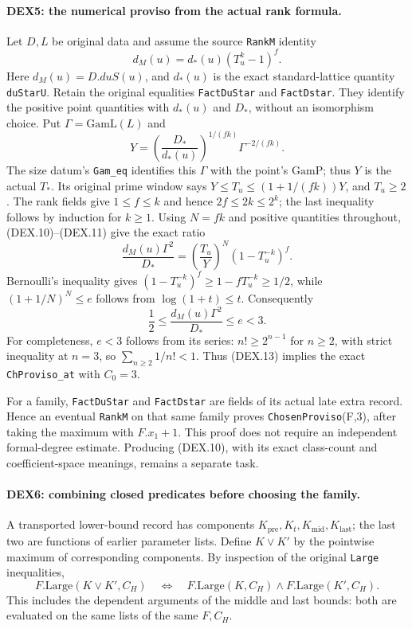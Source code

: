 \documentclass[11pt,a4paper]{article}
\numberwithin{equation}{section}
\theoremstyle{remark}\newtheorem{remark}[theorem]{Remark}
\begin{document}
\paragraph{DEX5: the numerical proviso from the actual rank formula.}
\label{claim:DEX5}
Let $D,L$ be original data and assume the source \texttt{RankM} identity
\[
 d_M(u)=d_*(u)(T_u^k-1)^f.                              \tag{DEX.10}
\]
Here $d_M(u)=D.duS(u)$, and $d_*(u)$ is the exact standard-lattice
quantity \texttt{duStarU}. Retain the original equalities
\texttt{FactDuStar} and \texttt{FactDstar}. They identify the positive
point quantities with $d_*(u)$ and $D_*$, without an isomorphism choice.
Put $\Gamma=\mathrm{GamL}(L)$ and
\[
 Y=\left(\frac{D_*}{d_*(u)}\right)^{1/(fk)}
                  \Gamma^{-2/(fk)} .                    \tag{DEX.11}
\]
The size datum's \texttt{Gam\_eq} identifies this $\Gamma$ with the
point's $\mathrm{GamP}$; thus $Y$ is the actual $T_*$.
Its original prime window says
$Y\le T_u\le(1+1/(fk))Y$, and $T_u\ge2$.
The rank fields give $1\le f\le k$ and hence
$2f\le2k\le2^k$; the last inequality follows by induction for $k\ge1$.
Using $N=fk$ and positive quantities throughout, (DEX.10)--(DEX.11)
give the exact ratio
\[
 \frac{d_M(u)\Gamma^2}{D_*}
       =\left(\frac{T_u}{Y}\right)^N(1-T_u^{-k})^f.       \tag{DEX.12}
\]
Bernoulli's inequality gives
$(1-T_u^{-k})^f\ge1-fT_u^{-k}\ge1/2$, while
$(1+1/N)^N\le e$ follows from $\log(1+t)\le t$.
Consequently
\[
                  \frac12\le\frac{d_M(u)\Gamma^2}{D_*}
                                      \le e<3.           \tag{DEX.13}
\]
For completeness, $e<3$ follows from its series:
$n!\ge2^{n-1}$ for $n\ge2$, with strict inequality at $n=3$, so
$\sum_{n\ge2}1/n!<1$. Thus (DEX.13) implies the exact
\texttt{ChProviso\_at} with $C_0=3$.

For a family, \texttt{FactDuStar} and \texttt{FactDstar} are fields of
its actual late extra record. Hence an eventual \texttt{RankM} on
that same family proves \texttt{ChosenProviso}(F,3), after taking
the maximum with $F.x_1+1$. This proof does not require an independent
formal-degree estimate. Producing (DEX.10), with its exact class-count
and coefficient-space meanings, remains a separate task.

\paragraph{DEX6: combining closed predicates before choosing the family.}
\label{claim:DEX6}
A transported lower-bound record has components
$K_{\mathrm{pre}},K_t,K_{\mathrm{mid}},K_{\mathrm{last}}$;
the last two are functions of earlier parameter lists. Define $K\vee K'$
by the pointwise maximum of corresponding components. By inspection
of the original \texttt{Large} inequalities,
\[
 F.\mathrm{Large}(K\vee K',C_H)
 \quad\Longleftrightarrow\quad
 F.\mathrm{Large}(K,C_H)\wedge F.\mathrm{Large}(K',C_H).   \tag{DEX.14}
\]
This includes the dependent arguments of the middle and last bounds:
both are evaluated on the same lists of the same $F,C_H$.
\end{document}
